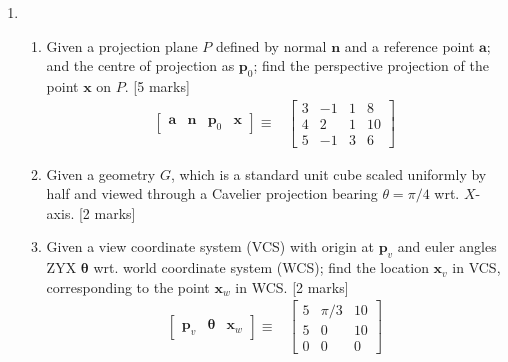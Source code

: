 \documentclass[11pt,a4paper,onecolumn]{qptiet}
\begin{document}
\begin{enumerate}[resume]
\item
  \begin{enumerate}
  \item Given a projection plane $P$ defined by normal
    $\textbf{n}$ and a reference point $\textbf{a}$;
    and the centre of projection as $\mathbf{p}_0$;
    find the perspective projection of the point
    $\textbf{x}$ on $P$. \hfill [5 marks]
    \begin{align*}
      \begin{bmatrix}
        \mathbf{a}&\mathbf{n}&\mathbf{p}_0&\mathbf{x}
      \end{bmatrix}\equiv
      &
        \begin{bmatrix}
          3&-1&1&8\\4&2&1&10\\5&-1&3&6
        \end{bmatrix}
    \end{align*}
  \item Given a geometry $G$, which is a standard unit
    cube scaled uniformly by half and viewed through a
    Cavelier projection bearing $\theta=\pi/4$
    wrt. $X$-axis. \hfill [2 marks]
  \item Given a view coordinate system (VCS) with
    origin at $\textbf{p}_v$ and euler angles ZYX
    $\boldsymbol{\theta}$ wrt. world coordinate system
    (WCS); find the location $\mathbf{x}_v$ in VCS,
    corresponding to the point $\textbf{x}_w$ in
    WCS. \hfill [2 marks]
    \begin{align*}
      \begin{bmatrix}
        \mathbf{p}_v & \boldsymbol{\theta} & \mathbf{x}_w
      \end{bmatrix}\equiv
      &\begin{bmatrix}
        5&\pi/3&10\\5&0&10\\0&0&0
      \end{bmatrix}
    \end{align*}
  \end{enumerate}
\end{enumerate}
\bvrhrule[0.4pt]
\end{document}
